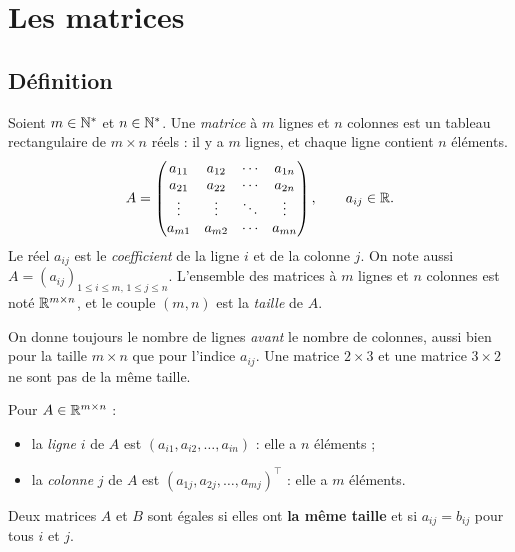 
\chapter{Les matrices}
\label{chap-matrices}

\section{Définition}

\begin{definition}[Matrice]
Soient $m \in \mathbb{N}^*$ et $n \in \mathbb{N}^*$. Une
\emph{matrice} à $m$ lignes et $n$ colonnes est un
tableau rectangulaire de $m \times n$ réels : il y a
$m$ lignes, et chaque ligne contient $n$ éléments.
\[
    A =
    \begin{pmatrix}
        a_{11} & a_{12} & \cdots & a_{1n} \\
        a_{21} & a_{22} & \cdots & a_{2n} \\
        \vdots & \vdots & \ddots & \vdots \\
        a_{m1} & a_{m2} & \cdots & a_{mn}
    \end{pmatrix},
    \qquad a_{ij} \in \mathbb{R}.
\]
Le réel $a_{ij}$ est le \emph{coefficient} de la
ligne $i$ et de la colonne $j$. On note aussi
$A = (a_{ij})_{1 \le i \le m,\, 1 \le j \le n}$.
L'ensemble des matrices à $m$ lignes et $n$ colonnes
est noté $\mathbb{R}^{m \times n}$, et le couple $(m, n)$
est la \emph{taille} de $A$.
\end{definition}

\begin{remark}
On donne toujours le nombre de lignes \emph{avant}
le nombre de colonnes, aussi bien pour la taille
$m \times n$ que pour l'indice $a_{ij}$. Une matrice
$2 \times 3$ et une matrice $3 \times 2$ ne sont pas
de la même taille.
\end{remark}

\begin{definition}
Pour $A \in \mathbb{R}^{m \times n}$ :
\begin{itemize}
    \item la \emph{ligne} $i$ de $A$ est
          $(a_{i1}, a_{i2}, \dots, a_{in})$ : elle a
          $n$ éléments ;
    \item la \emph{colonne} $j$ de $A$ est
          $(a_{1j}, a_{2j}, \dots, a_{mj})^\top$ :
          elle a $m$ éléments.
\end{itemize}
\end{definition}

\begin{definition}[Égalité]
Deux matrices $A$ et $B$ sont égales si elles ont
\textbf{la même taille} et si $a_{ij} = b_{ij}$ pour
tous $i$ et $j$.
\end{definition}

